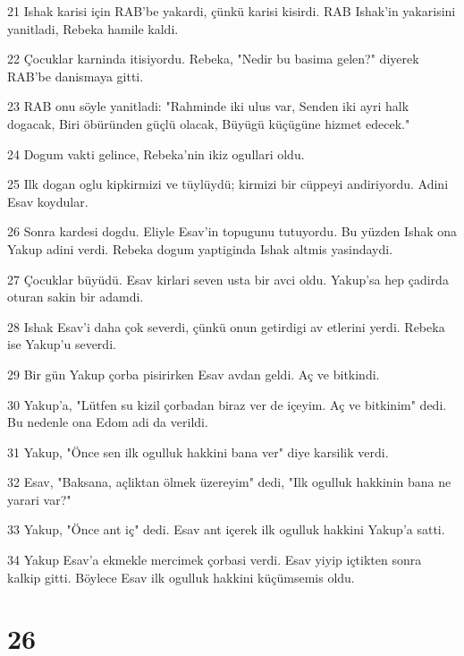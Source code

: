 \par 21 Ishak karisi için RAB'be yakardi, çünkü karisi kisirdi. RAB Ishak'in yakarisini yanitladi, Rebeka hamile kaldi.
\par 22 Çocuklar karninda itisiyordu. Rebeka, "Nedir bu basima gelen?" diyerek RAB'be danismaya gitti.
\par 23 RAB onu söyle yanitladi: "Rahminde iki ulus var, Senden iki ayri halk dogacak, Biri öbüründen güçlü olacak, Büyügü küçügüne hizmet edecek."
\par 24 Dogum vakti gelince, Rebeka'nin ikiz ogullari oldu.
\par 25 Ilk dogan oglu kipkirmizi ve tüylüydü; kirmizi bir cüppeyi andiriyordu. Adini Esav koydular.
\par 26 Sonra kardesi dogdu. Eliyle Esav'in topugunu tutuyordu. Bu yüzden Ishak ona Yakup adini verdi. Rebeka dogum yaptiginda Ishak altmis yasindaydi.
\par 27 Çocuklar büyüdü. Esav kirlari seven usta bir avci oldu. Yakup'sa hep çadirda oturan sakin bir adamdi.
\par 28 Ishak Esav'i daha çok severdi, çünkü onun getirdigi av etlerini yerdi. Rebeka ise Yakup'u severdi.
\par 29 Bir gün Yakup çorba pisirirken Esav avdan geldi. Aç ve bitkindi.
\par 30 Yakup'a, "Lütfen su kizil çorbadan biraz ver de içeyim. Aç ve bitkinim" dedi. Bu nedenle ona Edom adi da verildi.
\par 31 Yakup, "Önce sen ilk ogulluk hakkini bana ver" diye karsilik verdi.
\par 32 Esav, "Baksana, açliktan ölmek üzereyim" dedi, "Ilk ogulluk hakkinin bana ne yarari var?"
\par 33 Yakup, "Önce ant iç" dedi. Esav ant içerek ilk ogulluk hakkini Yakup'a satti.
\par 34 Yakup Esav'a ekmekle mercimek çorbasi verdi. Esav yiyip içtikten sonra kalkip gitti. Böylece Esav ilk ogulluk hakkini küçümsemis oldu.

\chapter{26}

